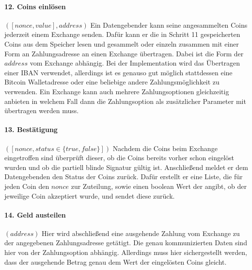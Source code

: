 \documentclass[11pt,a4paper]{scrreprt}
\begin{document}
\paragraph{12. Coins einlösen} $([nonce,value], address)$
Ein Datengebender kann seine angesammelten Coins jederzeit einem Exchange senden. Dafür kann er die in Schritt 11 gespeicherten Coins aus dem Speicher lesen und gesammelt oder einzeln zusammen mit einer Form an Zahlungsadresse an einen Exchange übertragen. Dabei ist die Form der $address$ vom Exchange abhängig. Bei der Implementation wird das Übertragen einer IBAN verwendet, allerdings ist es genauso gut möglich stattdessen eine Bitcoin Walletadresse oder eine beliebige andere Zahlungsmöglichkeit zu verwenden. Ein Exchange kann auch mehrere Zahlungsoptionen gleichzeitig anbieten in welchem Fall dann die Zahlungsoption als zusätzlicher Parameter mit übertragen werden muss.

\paragraph{13. Bestätigung} $([nonce, status \in \{true, false\}])$
Nachdem die Coins beim Exchange eingetroffen sind überprüft dieser, ob die Coins bereits vorher schon eingelöst wurden und ob die partiell blinde Signatur gültig ist. Anschließend meldet er dem Datengebenden den Status der Coins zurück. Dafür erstellt er eine Liste, die für jeden Coin den $nonce$ zur Zuteilung, sowie einen boolean Wert der angibt, ob der jeweilige Coin akzeptiert wurde, und sendet diese zurück.

\paragraph{14. Geld austeilen} $(address)$
Hier wird abschließend eine ausgehende Zahlung vom Exchange zu der angegebenen Zahlungsadresse getätigt. Die genau kommunizierten Daten sind hier von der Zahlungsoption abhängig. Allerdings muss hier sichergestellt werden, dass der ausgehende Betrag genau dem Wert der eingelösten Coins gleicht.
\end{document}
